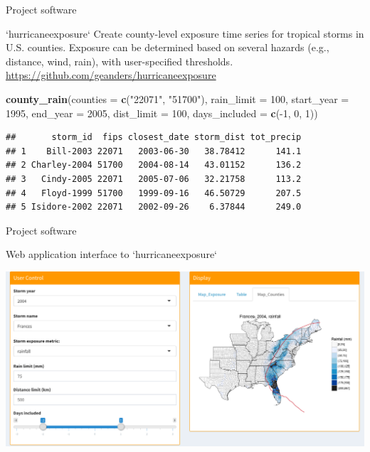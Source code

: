 \documentclass[ignorenonframetext,]{beamer}
\newenvironment{Shaded}{\begin{snugshade}}{\end{snugshade}}
\newcommand{\KeywordTok}[1]{\textcolor[rgb]{0.13,0.29,0.53}{\textbf{{#1}}}}
\newcommand{\DataTypeTok}[1]{\textcolor[rgb]{0.13,0.29,0.53}{{#1}}}
\newcommand{\DecValTok}[1]{\textcolor[rgb]{0.00,0.00,0.81}{{#1}}}
\newcommand{\StringTok}[1]{\textcolor[rgb]{0.31,0.60,0.02}{{#1}}}
\newcommand{\NormalTok}[1]{{#1}}
\begin{document}
\begin{frame}[fragile]{Project software}

\footnotesize

\begin{block}{`hurricaneexposure`}
Create county-level exposure time series for tropical storms in U.S. counties. Exposure can be determined based on several hazards (e.g., distance, wind, rain), with user-specified thresholds. 
\url{https://github.com/geanders/hurricaneexposure}
\end{block}

\begin{Shaded}
\begin{Highlighting}[]
\KeywordTok{county_rain}\NormalTok{(}\DataTypeTok{counties =} \KeywordTok{c}\NormalTok{(}\StringTok{"22071"}\NormalTok{, }\StringTok{"51700"}\NormalTok{), }\DataTypeTok{rain_limit =} \DecValTok{100}\NormalTok{, }
            \DataTypeTok{start_year =} \DecValTok{1995}\NormalTok{, }\DataTypeTok{end_year =} \DecValTok{2005}\NormalTok{, }\DataTypeTok{dist_limit =} \DecValTok{100}\NormalTok{,}
            \DataTypeTok{days_included =} \KeywordTok{c}\NormalTok{(-}\DecValTok{1}\NormalTok{, }\DecValTok{0}\NormalTok{, }\DecValTok{1}\NormalTok{))}
\end{Highlighting}
\end{Shaded}

\begin{verbatim}
##       storm_id  fips closest_date storm_dist tot_precip
## 1    Bill-2003 22071   2003-06-30   38.78412      141.1
## 2 Charley-2004 51700   2004-08-14   43.01152      136.2
## 3   Cindy-2005 22071   2005-07-06   32.21758      113.2
## 4   Floyd-1999 51700   1999-09-16   46.50729      207.5
## 5 Isidore-2002 22071   2002-09-26    6.37844      249.0
\end{verbatim}

\end{frame}

\begin{frame}{Project software}

\vspace{-0.2cm} \large

\begin{center}
Web application interface to `hurricaneexposure`
\end{center}

\vspace{-0.3cm}

\includegraphics[width=\textwidth]{hurricane_exposure_website}

\end{frame}
\end{document}
